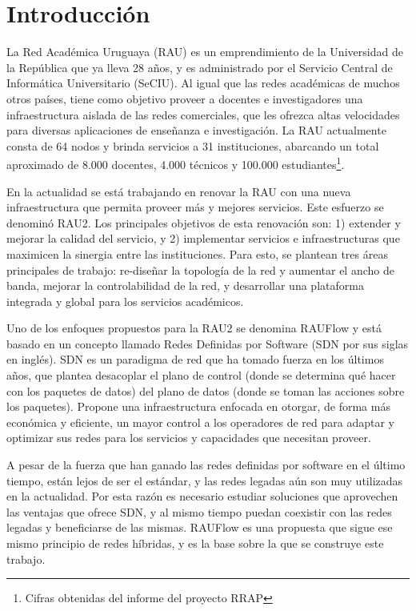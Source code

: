 \chapter{Introducción}
La Red Académica Uruguaya (RAU) es un emprendimiento de la Universidad de la República que ya lleva 28 años, y es administrado por el Servicio Central de Informática Universitario (SeCIU). Al igual que las redes académicas de muchos otros países, tiene como objetivo proveer a docentes e investigadores una infraestructura aislada de las redes comerciales, que les ofrezca altas velocidades para diversas aplicaciones de enseñanza e investigación. La RAU actualmente consta de 64 nodos y brinda servicios a 31 instituciones, abarcando un total aproximado de 8.000 docentes, 4.000 técnicos y 100.000 estudiantes\footnote{Cifras obtenidas del informe del proyecto RRAP}.

En la actualidad se está trabajando en renovar la RAU con una nueva infraestructura que permita proveer más y mejores servicios. Este esfuerzo se denominó RAU2. Los principales objetivos de esta renovación son: 1) extender y mejorar la calidad del servicio, y 2) implementar servicios e infraestructuras que maximicen la sinergia entre las instituciones. Para esto, se plantean tres áreas principales de trabajo: re-diseñar la topología de la red y aumentar el ancho de banda, mejorar la controlabilidad de la red, y desarrollar una plataforma integrada y global para los servicios académicos.

Uno de los enfoques propuestos para la RAU2 se denomina RAUFlow y está basado en un concepto llamado Redes Definidas por Software (SDN por sus siglas en inglés). SDN es un paradigma de red que ha tomado fuerza en los últimos años, que plantea desacoplar el plano de control (donde se determina qué hacer con los paquetes de datos) del plano de datos (donde se toman las acciones sobre los paquetes). Propone una infraestructura enfocada en otorgar, de forma más económica y eficiente, un mayor control a los operadores de red para adaptar y optimizar sus redes para los servicios y capacidades que necesitan proveer.

A pesar de la fuerza que han ganado las redes definidas por software en el último tiempo, están lejos de ser el estándar, y las redes legadas aún son muy utilizadas en la actualidad. Por esta razón es necesario estudiar soluciones que aprovechen las ventajas que ofrece SDN, y al mismo tiempo puedan coexistir con las redes legadas y beneficiarse de las mismas. RAUFlow es una propuesta que sigue ese mismo principio de redes híbridas, y es la base sobre la que se construye este trabajo.
\graphicspath{{Chapter1/Figs/}}

